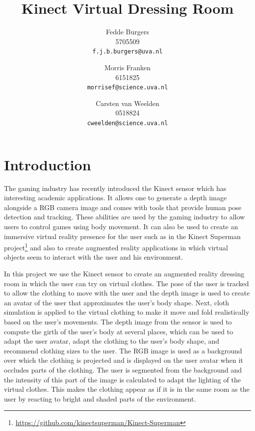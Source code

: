 \documentclass[a4paper]{article}
\title{Kinect Virtual Dressing Room}
\author{Fedde Burgers \\ 5705509 \\ \texttt{f.j.b.burgers@uva.nl} \and Morris Franken \\ 6151825 \\ \texttt{morrisef@science.uva.nl} \and Carsten van Weelden \\ 0518824 \\ \texttt{cweelden@science.uva.nl}}
\begin{document}
\maketitle

\begin{abstract}

\end{abstract}

\par{}

\section{Introduction}

The gaming industry has recently introduced the Kinect sensor which has interesting academic applications. It allows one to generate a depth image alongside a RGB camera image and comes with tools that provide human pose detection and tracking. These abilities are used by the gaming industry to allow users to control games using body movement. It can also be used to create an immersive virtual reality presence for the user such as in the Kinect Superman project\footnote{\url{https://github.com/kinectsuperman/Kinect-Superman}} and also to create augmented reality applications in which virtual objects seem to interact with the user and his environment.

In this project we use the Kinect sensor to create an augmented reality dressing room in which the user can try on virtual clothes. The pose of the user is tracked to allow the clothing to move with the user and the depth image is used to create an avatar of the user that approximates the user's body shape. Next, cloth simulation is applied to the virtual clothing to make it move and fold realistically based on the user's movements. The depth image from the sensor is used to compute the girth of the user's body at several places, which can be used to adapt the user avatar, adapt the clothing to the user's body shape, and recommend clothing sizes to the user. The RGB image is used as a background over which the clothing is projected and is displayed on the user avatar when it occludes parts of the clothing. The user is segmented from the background and the intensity of this part of the image is calculated to adapt the lighting of the virtual clothes. This makes the clothing appear as if it is in the same room as the user by reacting to bright and shaded parts of the environment.
\end{document}
